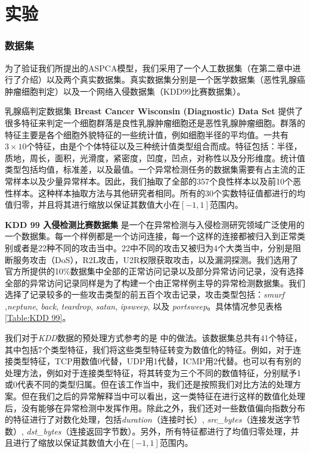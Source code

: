 \chapter{实验}

\subsection{数据集}
为了验证我们所提出的ASPCA模型，我们采用了一个人工数据集（在第二章中进行了介绍）以及两个真实数据集。真实数据集分别是一个医学数据集（恶性乳腺癌肿瘤细胞判定）以及一个网络入侵数据集（KDD99比赛数据集）。

乳腺癌判定数据集 {\bf Breast Cancer Wisconsin (Diagnostic) Data Set}  \cite{breast-cancer-data} 提供了很多特征来判定一个细胞群落是良性乳腺肿瘤细胞还是恶性乳腺肿瘤细胞。群落的特征主要是各个细胞外貌特征的一些统计值，例如细胞半径的平均值。一共有$3\times10$个特征，由是个个体特征以及三种统计值类型组合而成。特征包括：半径，质地，周长，面积，光滑度，紧密度，凹度，凹点，对称性以及分形维度。统计值类型包括均值，标准差，以及最值。一个异常检测任务的数据集需要有占主流的正常样本以及少量异常样本。因此，我们抽取了全部的357个良性样本以及前10个恶性样本。这种样本抽取方法与其他研究者\cite{Kriegel:2009:LLO, Amer:2013:EOS}相同。所有的30个实数特征值都进行的均值归零，并且将其进行缩放以保证其数值大小在$[-1, 1]$范围内。

{\bf KDD 99 入侵检测比赛数据集} \cite{cup1999data}  是一个在异常检测与入侵检测研究领域广泛使用的一个数据集。每一个样例都是一个访问连接，每一个这样的连接都被归入到正常类别或者是22种不同的攻击当中。22中不同的攻击又被归为4个大类当中，分别是阻断服务攻击（DoS），R2L攻击，U2R权限获取攻击，以及漏洞探测。我们选用了官方所提供的10\%数据集中全部的正常访问记录以及部分异常访问记录，没有选择全部的异常访问记录同样是为了构建一个由正常样例主导的异常检测数据集。我们选择了记录较多的一些攻击类型的前五百个攻击记录，攻击类型包括：\emph{smurf} ,\emph{neptune}, \emph{back}, \emph{teardrop}, \emph{satan}, \emph{ipsweep}, 以及 \emph{portsweep}。具体情况参见表格 \ref{Table:KDD 99}。

我们对于\emph{KDD}数据的预处理方式参考的是 \cite{jiang2013family}中的做法。该数据集总共有41个特征，其中包括7个类型特征，我们将这些类型特征转变为数值化的特征。例如，对于连接类型特征，TCP用数值0代替，UDP用1代替，ICMP用2代替。也可以有有别的处理方法，例如对于连接类型特征，将其转变为三个不同的数值特征，分别赋予1或0代表不同的类型归属。但在该工作当中，我们还是按照我们对比方法的处理方案。但在我们之后的异常解释当中可以看出，这一类特征在进行这样的数值化处理后，没有能够在异常检测中发挥作用。除此之外，我们还对一些数值偏向指数分布的特征进行了对数化处理，包括\emph{duration}（连接时长）,  \emph{src\_bytes}（连接发送字节数）,  \emph{dst\_bytes}（连接返回字节数）。另外，所有特征都进行了均值归零处理，并且进行了缩放以保证其数值大小在$[-1, 1]$范围内。

